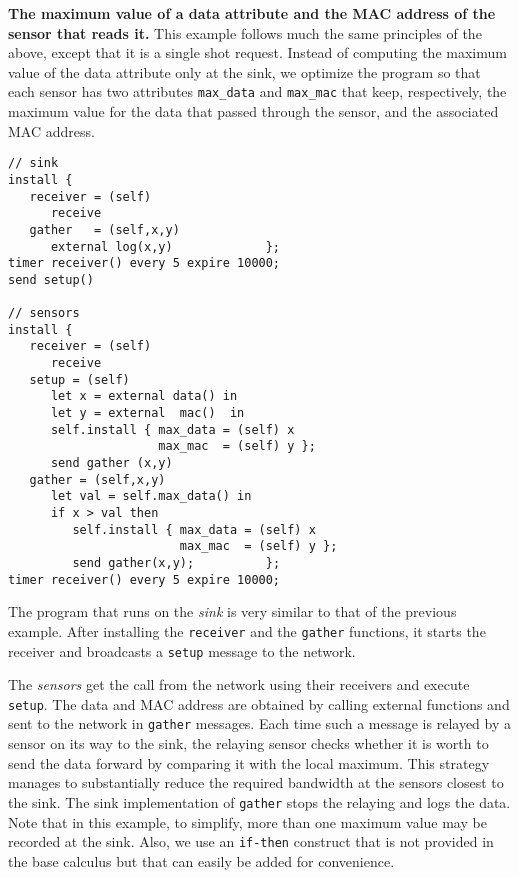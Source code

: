 \documentclass[copyright,creativecommons]{eptcs}
\begin{document}
\textbf{The maximum value of a data attribute and the MAC address of
 the sensor that reads it.} This example follows much the same
principles of the above, except that it is a single shot
request. Instead of computing the maximum value of the data attribute
only at the sink, we optimize the program so that each sensor has two
attributes \lstinline{max_data} and \lstinline{max_mac} that keep,
respectively, the maximum value for the data that passed through the
sensor, and the associated MAC address.\\

\begin{lstlisting}
// sink
install { 
   receiver = (self) 
      receive
   gather   = (self,x,y) 
      external log(x,y)             };
timer receiver() every 5 expire 10000;
send setup()

// sensors
install { 
   receiver = (self) 
      receive
   setup = (self)     
      let x = external data() in 
      let y = external  mac()  in 
      self.install { max_data = (self) x 
                     max_mac  = (self) y };
      send gather (x,y)
   gather = (self,x,y) 
      let val = self.max_data() in 
      if x > val then 
         self.install { max_data = (self) x 
                        max_mac  = (self) y };
         send gather(x,y);          };
timer receiver() every 5 expire 10000;
\end{lstlisting}

The program that runs on the \emph{sink} is very similar to that of
the previous example. After installing the \lstinline{receiver} and
the \lstinline{gather} functions, it starts the receiver and
broadcasts a \lstinline{setup} message to the network.

The \emph{sensors} get the call from the network using their receivers
and execute \lstinline{setup}. The data and MAC address are obtained
by calling external functions and sent to the network in
\lstinline{gather} messages. Each time such a message is relayed by a
sensor on its way to the sink, the relaying sensor checks whether it
is worth to send the data forward by comparing it with the local
maximum. This strategy manages to substantially reduce the required
bandwidth at the sensors closest to the sink. The sink implementation
of \lstinline{gather} stops the relaying and logs the data. Note that
in this example, to simplify, more than one maximum value may be
recorded at the sink. Also, we use an \lstinline{if-then} construct
that is not provided in the base calculus but that can easily be added
for convenience.
\end{document}
